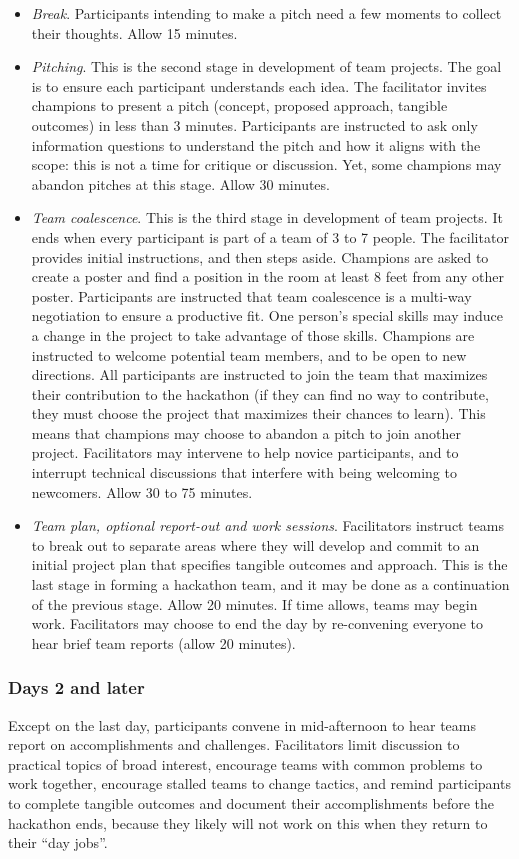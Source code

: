 \documentclass[letterpaper,11pt]{texMemo}
\begin{document}
\begin{itemize}
\item	{\em Break}. Participants intending to make a pitch need a few moments to collect their thoughts. Allow 15 minutes. 
\item	{\em Pitching}. This is the second stage in development of team projects. The goal is to ensure each participant understands each idea. The facilitator invites champions to present a pitch (concept, proposed approach, tangible outcomes) in less than 3 minutes. Participants are instructed to ask only information questions to understand the pitch and how it aligns with the scope: this is not a time for critique or discussion.  Yet, some champions may abandon pitches at this stage. Allow 30 minutes.   
\item	{\em Team coalescence}. This is the third stage in development of team projects. It ends when every participant is part of a team of 3 to 7 people. The facilitator provides initial instructions, and then steps aside. Champions are asked to create a poster and find a position in the room at least 8 feet from any other poster. Participants are instructed that team coalescence is a multi-way negotiation to ensure a productive fit. One person’s special skills may induce a change in the project to take advantage of those skills. Champions are instructed to welcome potential team members, and to be open to new directions. All participants are instructed to join the team that maximizes their contribution to the hackathon (if they can find no way to contribute, they must choose the project that maximizes their chances to learn). This means that champions may choose to abandon a pitch to join another project. Facilitators may intervene to help novice participants, and to interrupt technical discussions that interfere with being welcoming to newcomers. Allow 30 to 75 minutes.  
\item	{\em Team plan, optional report-out and work sessions}. Facilitators instruct teams to break out to separate areas where they will develop and commit to an initial project plan that specifies tangible outcomes and approach. This is the last stage in forming a hackathon team, and it may be done as a continuation of the previous stage.  Allow 20 minutes. If time allows, teams may begin work. Facilitators may choose to end the day by re-convening everyone to hear brief team reports (allow 20 minutes). 
\end{itemize}
\subsubsection*{Days 2 and later} Except on the last day, participants convene in mid-afternoon to hear teams report on accomplishments and challenges. Facilitators limit discussion to practical topics of broad interest, encourage teams with common problems to work together, encourage stalled teams to change tactics, and remind participants to complete tangible outcomes and document their accomplishments before the hackathon ends, because they likely will not work on this when they return to their “day jobs”. 
\end{document}
